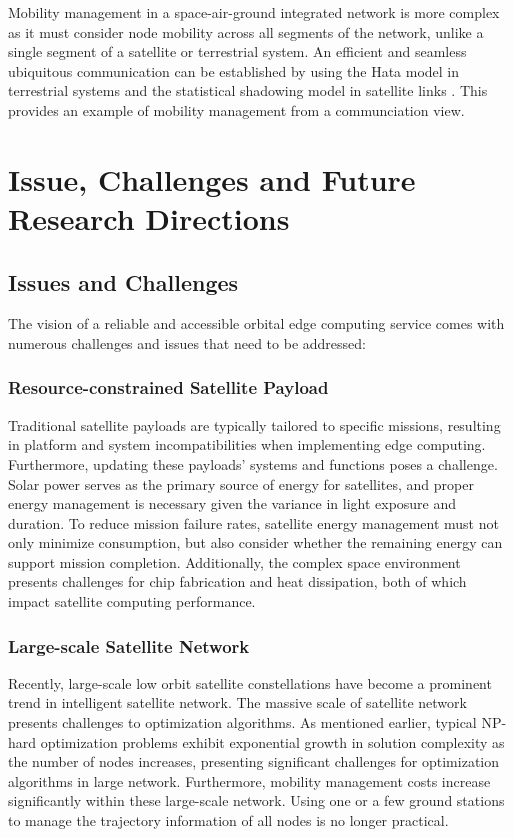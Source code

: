 \documentclass[lettersize,journal]{IEEEtran}
\begin{document}
Mobility management in a space-air-ground integrated network is more complex as it must consider node mobility across all segments of the network, unlike a single segment of a satellite or terrestrial system. An efficient and seamless ubiquitous communication can be established by using the Hata model in terrestrial systems and the statistical shadowing model in satellite links \cite{RN244}. This provides an example of mobility management from a communciation view. 

\section{Issue, Challenges and Future Research Directions}
\label{sec6}

\subsection{Issues and Challenges}
The vision of a reliable and accessible orbital edge computing service comes with numerous challenges and issues that need to be addressed:

\subsubsection*{Resource-constrained Satellite Payload} Traditional satellite payloads are typically tailored to specific missions, resulting in platform and system incompatibilities when implementing edge computing. Furthermore, updating these payloads' systems and functions poses a challenge. Solar power serves as the primary source of energy for satellites, and proper energy management is necessary given the variance in light exposure and duration. To reduce mission failure rates, satellite energy management must not only minimize consumption, but also consider whether the remaining energy can support mission completion. Additionally, the complex space environment presents challenges for chip fabrication and heat dissipation, both of which impact satellite computing performance.


\subsubsection*{Large-scale Satellite Network} Recently, large-scale low orbit satellite constellations have become a prominent trend in intelligent satellite network. The massive scale of satellite network presents challenges to optimization algorithms. As mentioned earlier, typical NP-hard optimization problems exhibit exponential growth in solution complexity as the number of nodes increases, presenting significant challenges for optimization algorithms in large network. Furthermore, mobility management costs increase significantly within these large-scale network. Using one or a few ground stations to manage the trajectory information of all nodes is no longer practical.
\end{document}
